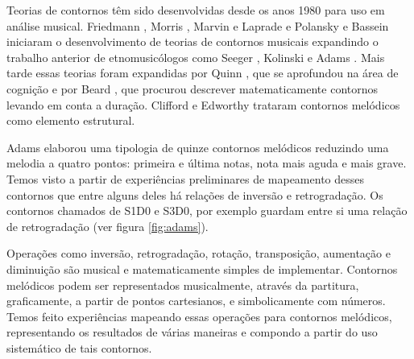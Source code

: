 \documentclass{article}
\begin{document}
Teorias de contornos têm sido desenvolvidas desde os anos 1980 para
uso em análise musical. Friedmann
\cite{friedmann85:_method_discus_contour,friedmann1987rmc}, Morris
\cite{morris1987cpc}, Marvin e Laprade
\cite{marvin87:_relat_music_contour} e Polansky e Bassein
\cite{polansky92:_possib_impos_melod} iniciaram o desenvolvimento de
teorias de contornos musicais expandindo o trabalho anterior de
etnomusicólogos como Seeger \cite{seeger1960mml}, Kolinski
\cite{kolinkski65:_struc_melod_movem} e Adams
\cite{adams1976mct}.
Mais tarde essas teorias foram expandidas por
Quinn \cite{quinn97:_fuzzy_exten_theor_contour}, que se aprofundou na
área de cognição e por Beard \cite{beard2003cmm}, que procurou
descrever matematicamente contornos levando em conta a duração.
Clifford \cite{clifford1995cse} e Edworthy \cite{edworthy1985mca}
trataram contornos melódicos como elemento estrutural.


Adams \cite{adams1976mct} elaborou uma tipologia de quinze contornos
melódicos reduzindo uma melodia a quatro pontos: primeira e última
notas, nota mais aguda e mais grave. Temos visto a partir de
experiências preliminares de mapeamento desses contornos que entre
alguns deles há relações de inversão e retrogradação. Os contornos
chamados de S1D0 e S3D0, por exemplo guardam entre si uma relação de
retrogradação (ver figura \ref{fig:adams}).

Operações como inversão, retrogradação, rotação, transposição,
aumentação e diminuição são musical e matematicamente simples de
implementar. Contornos melódicos podem ser representados musicalmente,
através da partitura, graficamente, a partir de pontos cartesianos, e
simbolicamente com números. Temos feito experiências mapeando essas
operações para contornos melódicos, representando os resultados de
várias maneiras e compondo a partir do uso sistemático de tais
contornos.
\end{document}
